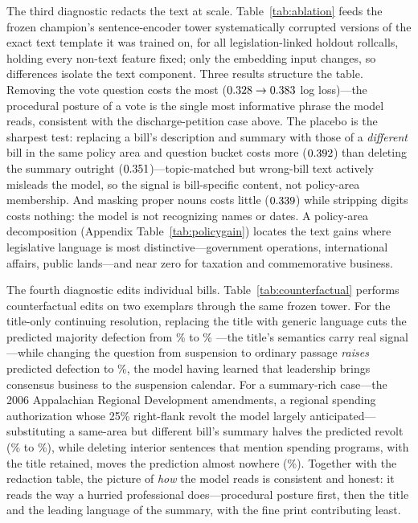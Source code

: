 \documentclass[12pt]{article}
\begin{document}
The third diagnostic redacts the text at scale.
Table~\ref{tab:ablation} feeds the frozen champion's sentence-encoder
tower systematically corrupted versions of the exact text template it
was trained on, for all \ablRC{} legislation-linked holdout rollcalls,
holding every non-text feature fixed; only the embedding input
changes, so differences isolate the text component. Three results
structure the table. Removing the vote question costs the most
($0.328 \rightarrow 0.383$ log loss)---the procedural
posture of a vote is the single most informative phrase the model
reads, consistent with the discharge-petition case above. The placebo
is the sharpest test: replacing a bill's description and summary with
those of a \emph{different} bill in the same policy area and question
bucket costs more ($0.392$) than deleting the summary outright
($0.351$)---topic-matched but wrong-bill text actively misleads
the model, so the signal is bill-specific content, not policy-area
membership. And masking proper nouns costs little
($0.339$) while stripping digits costs nothing: the model is
not recognizing names or dates. A policy-area decomposition
(Appendix Table~\ref{tab:policygain}) locates the text gains where
legislative language is most distinctive---government operations,
international affairs, public lands---and near zero for taxation and
commemorative business.

\begin{table}[t]
\centering
\caption{Redaction ablations. Each row re-scores the identical
member-vote cells through the frozen model, changing only the text
supplied to its sentence encoder ($N = \ablRC$ legislation-linked
holdout rollcalls). The defection AUC is the noisier statistic (507
rollcalls) and is shown for completeness; log loss is the scoring
rule.}
\label{tab:ablation}
{\small }
\end{table}

The fourth diagnostic edits individual bills.
Table~\ref{tab:counterfactual} performs counterfactual edits on two
exemplars through the same frozen tower. For the title-only
continuing resolution, replacing the title with generic language cuts
the predicted majority defection from \cfAraOrig\% to \cfAraGeneric\%
---the title's semantics carry real signal---while changing the
question from suspension to ordinary passage \emph{raises} predicted
defection to \cfAraPassage\%, the model having learned that
leadership brings consensus business to the suspension calendar. For
a summary-rich case---the 2006 Appalachian Regional Development
amendments, a regional spending authorization whose 25\% right-flank
revolt the model largely anticipated---substituting a same-area but
different bill's summary halves the predicted revolt
(\cfArdaOrig\% to \cfArdaSwap\%), while deleting interior sentences
that mention spending programs, with the title retained, moves the
prediction almost nowhere (\cfArdaCut\%). Together with the
redaction table, the picture of \emph{how} the model reads is
consistent and honest: it reads the way a hurried professional
does---procedural posture first, then the title and the leading
language of the summary, with the fine print contributing least.
\end{document}
